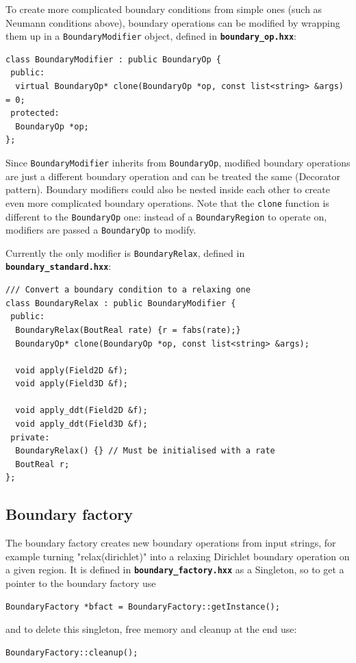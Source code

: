 \documentclass[12pt]{article}
\newcommand{\code}[1]{\texttt{#1}}
\newcommand{\file}[1]{\texttt{\bf #1}}
\begin{document}
To create more complicated boundary conditions from simple ones (such as
Neumann conditions above), boundary operations can be modified by
wrapping them up in a \code{BoundaryModifier} object, defined
in \file{boundary\_op.hxx}: 
\begin{lstlisting}[firstnumber=63]
class BoundaryModifier : public BoundaryOp {
 public:
  virtual BoundaryOp* clone(BoundaryOp *op, const list<string> &args) = 0;
 protected:
  BoundaryOp *op;
};
\end{lstlisting}
Since \code{BoundaryModifier} inherits from \code{BoundaryOp}, 
modified boundary operations are just a different boundary operation and can
be treated the same (Decorator pattern). Boundary modifiers could also be
nested inside each other to create even more complicated boundary operations.
Note that the \code{clone} function is different to the \code{BoundaryOp} one:
instead of a \code{BoundaryRegion} to operate on, modifiers are passed a
\code{BoundaryOp} to modify.

Currently the only modifier is \code{BoundaryRelax}, defined in
\file{boundary\_standard.hxx}: 
\begin{lstlisting}[firstnumber=64]
/// Convert a boundary condition to a relaxing one
class BoundaryRelax : public BoundaryModifier {
 public:
  BoundaryRelax(BoutReal rate) {r = fabs(rate);}
  BoundaryOp* clone(BoundaryOp *op, const list<string> &args);
  
  void apply(Field2D &f);
  void apply(Field3D &f);
  
  void apply_ddt(Field2D &f);
  void apply_ddt(Field3D &f);
 private:
  BoundaryRelax() {} // Must be initialised with a rate
  BoutReal r;
};
\end{lstlisting}

\subsection{Boundary factory}
\label{sec:BoundaryFactory}
The boundary factory creates new boundary operations from input strings,
for example turning "relax(dirichlet)" into a relaxing Dirichlet boundary
operation on a given region. It is defined in \file{boundary\_factory.hxx}
as a Singleton, so to get a pointer to the boundary factory use
\begin{lstlisting}[numbers=none]
  BoundaryFactory *bfact = BoundaryFactory::getInstance();
\end{lstlisting}
and to delete this singleton, free memory and cleanup at the end use:
\begin{lstlisting}[numbers=none]
  BoundaryFactory::cleanup();
\end{lstlisting}
\end{document}
